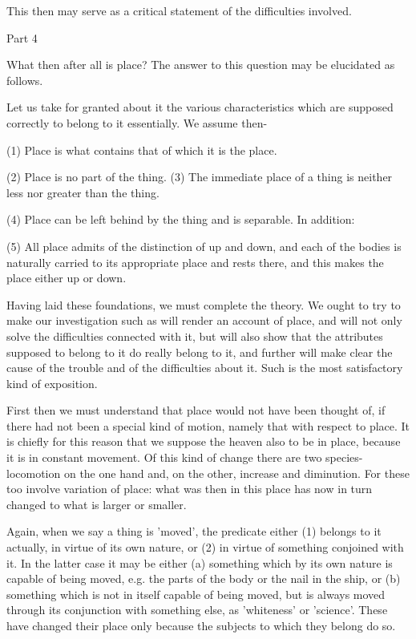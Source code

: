 This then may serve as a critical statement of the difficulties involved.

Part 4

What then after all is place? The answer to this question may be elucidated
as follows. 

Let us take for granted about it the various characteristics which
are supposed correctly to belong to it essentially. We assume then-

(1) Place is what contains that of which it is the place.

(2) Place is no part of the thing. 
(3) The immediate place of a thing is neither less nor greater than
the thing. 

(4) Place can be left behind by the thing and is separable. In addition:

(5) All place admits of the distinction of up and down, and each of
the bodies is naturally carried to its appropriate place and rests
there, and this makes the place either up or down. 

Having laid these foundations, we must complete the theory. We ought
to try to make our investigation such as will render an account of
place, and will not only solve the difficulties connected with it,
but will also show that the attributes supposed to belong to it do
really belong to it, and further will make clear the cause of the
trouble and of the difficulties about it. Such is the most satisfactory
kind of exposition. 

First then we must understand that place would not have been thought
of, if there had not been a special kind of motion, namely that with
respect to place. It is chiefly for this reason that we suppose the
heaven also to be in place, because it is in constant movement. Of
this kind of change there are two species-locomotion on the one hand
and, on the other, increase and diminution. For these too involve
variation of place: what was then in this place has now in turn changed
to what is larger or smaller. 

Again, when we say a thing is 'moved', the predicate either (1) belongs
to it actually, in virtue of its own nature, or (2) in virtue of something
conjoined with it. In the latter case it may be either (a) something
which by its own nature is capable of being moved, e.g. the parts
of the body or the nail in the ship, or (b) something which is not
in itself capable of being moved, but is always moved through its
conjunction with something else, as 'whiteness' or 'science'. These
have changed their place only because the subjects to which they belong
do so. 


